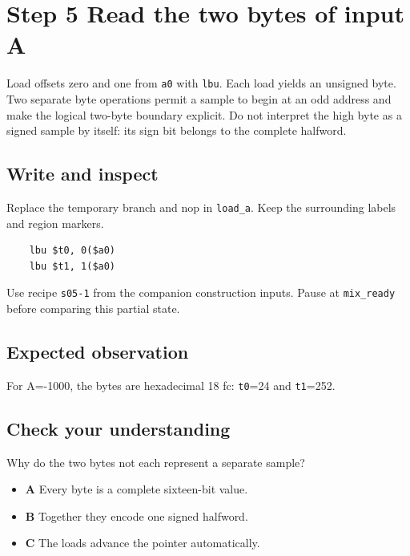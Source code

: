 \section{Step 5 Read the two bytes of input A}\label{pcm-s05}

Load offsets zero and one from \texttt{a0} with \texttt{lbu}. Each load yields an unsigned byte. Two separate byte operations permit a sample to begin at an odd address and make the logical two-byte boundary explicit. Do not interpret the high byte as a signed sample by itself: its sign bit belongs to the complete halfword.

\subsection{Write and inspect}
Replace the temporary branch and nop in \texttt{load\_a}. Keep the surrounding labels and region markers.

\begin{verbatim}
    lbu $t0, 0($a0)
    lbu $t1, 1($a0)
\end{verbatim}
Use recipe \texttt{s05-1} from the companion construction inputs. Pause at \texttt{mix\_ready} before comparing this partial state.

\subsection{Expected observation}
For A=-1000, the bytes are hexadecimal 18 fc: \texttt{t0}=24 and \texttt{t1}=252.

\subsection{Check your understanding}
Why do the two bytes not each represent a separate sample?

\begin{itemize}
  \item \textbf{A} Every byte is a complete sixteen-bit value.
  \item \textbf{B} Together they encode one signed halfword.
  \item \textbf{C} The loads advance the pointer automatically.
\end{itemize}
